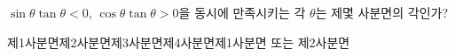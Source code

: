 $\sin\theta\tan\theta<0$, $\cos\theta\tan\theta>0$을 동시에 만족시키는 각 $\theta$는 제몇 사분면의 각인가?
\begin{choicesii}{제1사분면}{제2사분면}{제3사분면}{제4사분면}{제1사분면 또는 제2사분면}\end{choicesii}
